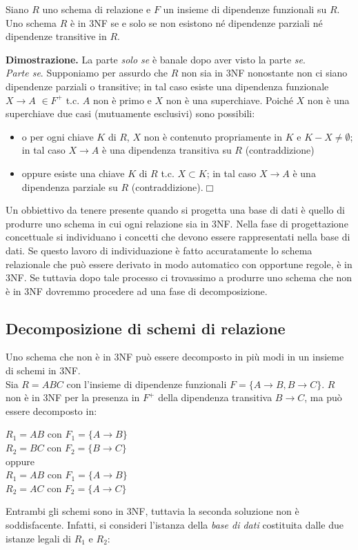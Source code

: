 \begin{theo}
Siano $R$ uno schema di relazione e $F$ un insieme di dipendenze funzionali su $R$. Uno
schema $R$ è in 3NF se e solo se non esistono né dipendenze parziali né dipendenze 
transitive in $R$.
\end{theo}
\textbf{Dimostrazione.} La parte \emph{solo se} è banale dopo aver visto la parte \emph{se}.\\
\emph{Parte se}. Supponiamo per assurdo che $R$ non sia in 3NF nonostante non ci siano
dipendenze parziali o transitive; in tal caso esiste una dipendenza funzionale $X\rightarrow A$
$\in F^+$ t.c. $A$ non è primo e $X$ non è una superchiave. Poiché $X$ non è una
superchiave due casi (mutuamente esclusivi) sono possibili:
\begin{itemize}
 \item o per ogni chiave $K$ di $R$, $X$ non è contenuto propriamente in $K$ e $K-X \neq 
 \emptyset$; in tal caso $X\rightarrow A$ è una dipendenza transitiva su $R$ (contraddizione)
 \item oppure esiste una chiave $K$ di $R$ t.c. $X \subset K$; in tal caso $X\rightarrow A$ 
 è una dipendenza parziale su $R$ (contraddizione).\hfill $\Box$
\end{itemize}
Un obbiettivo da tenere presente quando si progetta una base di dati è quello di produrre 
uno schema in cui ogni relazione sia in 3NF. Nella fase di progettazione concettuale si 
individuano i concetti che devono essere rappresentati nella base di dati. Se questo lavoro 
di individuazione è fatto accuratamente lo schema relazionale che può essere derivato in modo
automatico con opportune regole, è in 3NF. Se tuttavia dopo tale processo ci trovassimo a 
produrre uno schema che non è in 3NF dovremmo procedere ad una fase di decomposizione.

\subsection{Decomposizione di schemi di relazione}
Uno schema che non è in 3NF può essere decomposto in più modi in un insieme di schemi in 3NF.\\
 Sia $R = ABC$ con l'insieme di dipendenze funzionali $F = \{A\rightarrow B, B\rightarrow C\}$.
$R$ non è in 3NF per la presenza in $F^+$ della dipendenza transitiva $B\rightarrow C$, ma può 
essere decomposto in:
\begin{center}
  $R_1 = AB$ con $F_1=\{A\rightarrow B\}$\\
  $R_2 = BC$ con $F_2=\{B\rightarrow C\}$\\
  oppure\\
  $R_1 = AB$ con $F_1=\{A\rightarrow B\}$\\
  $R_2 = AC$ con $F_2=\{A\rightarrow C\}$\\
\end{center}
Entrambi gli schemi sono in 3NF, tuttavia la seconda soluzione non è soddisfacente. Infatti,
si consideri l'istanza della \emph{base di dati} costituita dalle due istanze legali di $R_1$ e $R_2$:

